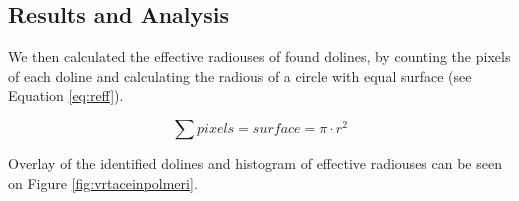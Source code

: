 \documentclass[a0,portrait]{a0poster}
\begin{document}
\begin{multicols}{2}

\section*{Results and Analysis}

We then calculated the effective radiouses of found dolines, by counting the pixels of each doline and calculating the radious of a circle with equal surface (see Equation \ref{eq:reff}).

\begin{equation}
	\sum pixels = surface = \pi \cdot r^2
	\label{eq:reff}
\end{equation}

Overlay of the identified dolines and histogram of effective radiouses can be seen on Figure \ref{fig:vrtaceinpolmeri}.


\end{multicols}
\end{document}
